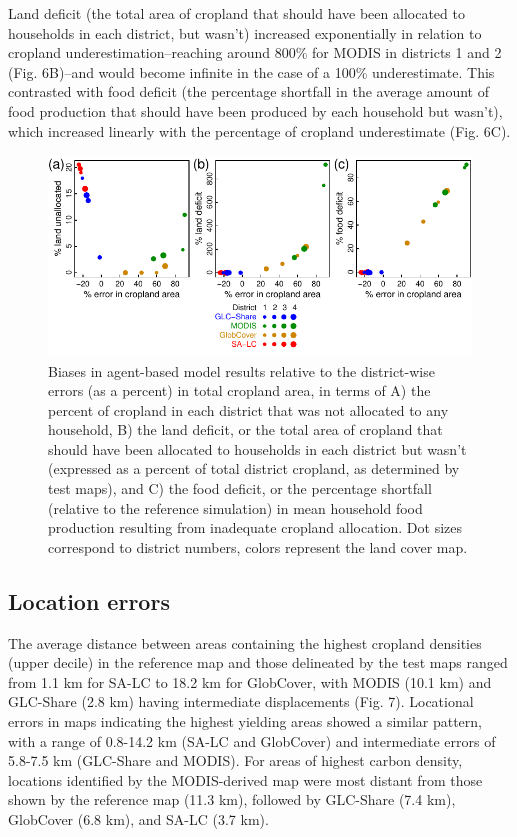 \documentclass[12 pt, titlepage, a4paper]{article}
\begin{document}
Land deficit (the total area of cropland that should have been allocated to households in each district, but wasn't) increased exponentially in relation to cropland underestimation--reaching around 800\% for MODIS in districts 1 and 2 (Fig. 6B)--and would become infinite in the case of a 100\% underestimate. This contrasted with food deficit (the percentage shortfall in the average amount of food production that should have been produced by each household but wasn't), which increased linearly with the percentage of cropland underestimate (Fig. 6C). 


\begin{figure}[ht]
\centerline{\includegraphics[width=.55\textwidth]{figures/fig6.pdf}}
\caption{Biases in agent-based model results relative to the district-wise errors (as a percent) in total cropland area, in terms of A) the percent of cropland in each district that was not allocated to any household, B) the land deficit, or the total area of cropland that should have been allocated to households in each district but wasn't (expressed as a percent of total district cropland, as determined by test maps), and C) the food deficit, or the percentage shortfall (relative to the reference simulation) in mean household food production resulting from inadequate cropland allocation. Dot sizes correspond to district numbers, colors represent the land cover map.}
\label{afoto}
\end{figure}

\vspace{-0.3 cm}
\subsection*{Location errors}
\vspace{-0.2 cm}
The average distance between areas containing the highest cropland densities (upper decile) in the reference map and those delineated by the test maps ranged from 1.1 km for SA-LC to 18.2 km for GlobCover, with MODIS (10.1 km) and GLC-Share (2.8 km) having intermediate displacements (Fig. 7). Locational errors in maps indicating the highest yielding areas showed a similar pattern, with a range of 0.8-14.2 km (SA-LC and GlobCover) and intermediate errors of 5.8-7.5 km (GLC-Share and MODIS). For areas of highest carbon density, locations identified by the MODIS-derived map were most distant from those shown by the reference map (11.3 km), followed by GLC-Share (7.4 km), GlobCover (6.8 km), and SA-LC (3.7 km).   
\end{document}
